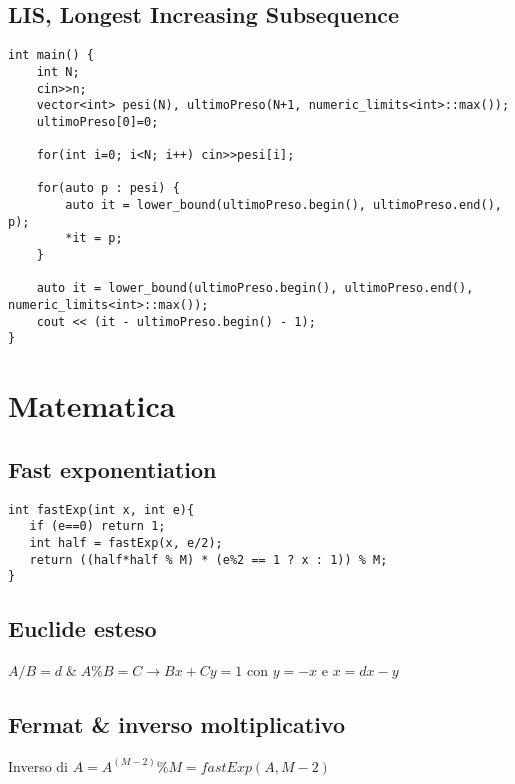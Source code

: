 \documentclass{article}
\begin{document}
\subsection{LIS, Longest Increasing Subsequence}
\begin{lstlisting}
int main() {
    int N;
    cin>>n;
    vector<int> pesi(N), ultimoPreso(N+1, numeric_limits<int>::max());
    ultimoPreso[0]=0;

    for(int i=0; i<N; i++) cin>>pesi[i];

    for(auto p : pesi) {
        auto it = lower_bound(ultimoPreso.begin(), ultimoPreso.end(), p);
        *it = p;
    }

    auto it = lower_bound(ultimoPreso.begin(), ultimoPreso.end(), numeric_limits<int>::max());
    cout << (it - ultimoPreso.begin() - 1);
}
\end{lstlisting}

\section{Matematica}

\subsection{Fast exponentiation}
\begin{lstlisting}
int fastExp(int x, int e){
   if (e==0) return 1;
   int half = fastExp(x, e/2);
   return ((half*half % M) * (e%2 == 1 ? x : 1)) % M;
}
\end{lstlisting}

\subsection{Euclide esteso}
$A/B=d\; \& \;A\%B=C \rightarrow Bx+Cy = 1$ con $y=-x$ e $x = dx - y$

\subsection{Fermat \& inverso moltiplicativo}
Inverso di $A = A^{(M-2)}\%M = fastExp(A, M-2)$
\end{document}
